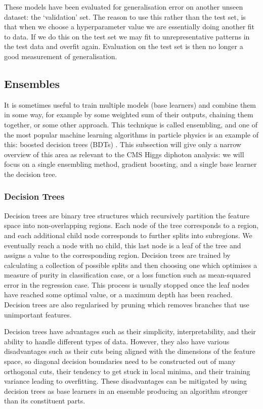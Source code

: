 These models have been evaluated for generalisation error on another unseen dataset: the `validation' set. The reason to use this rather than the test set, is that when we choose a hyperparameter value we are essentially doing another fit to data. If we do this on the test set we may fit to unrepresentative patterns in the test data and overfit again. Evaluation on the test set is then no longer a good measurement of generalisation. 








\subsection{Ensembles}

It is sometimes useful to train multiple models (base learners) and combine them in some way, for example by some weighted sum of their outputs, chaining them together, or some other approach. This technique is called ensembling, and one of the most popular machine learning algorithms in particle physics is an example of this: boosted decision trees (BDTs) \cite{MiniBooneBDT}. This subsection will give only a narrow overview of this area as relevant to the CMS Higgs diphoton analysis: we will focus on a single ensembling method, gradient boosting, and a single base learner the decision tree.


\subsubsection{Decision Trees}
Decision trees \cite{DecisionTrees} are binary tree structures which recursively partition the feature space into non-overlapping regions. Each node of the tree corresponds to a region, and each additional child node corresponds to further splits into subregions. We eventually reach a node with no child, this last node is a leaf of the tree and assigns a value to the corresponding region.  
Decision trees are trained by calculating a collection of possible splits and then choosing one which optimises a measure of purity in classification case, or a loss function such as mean-squared error in the regression case. This process is usually stopped once the leaf nodes have reached some optimal value, or a maximum depth has been reached. 
Decision trees are also regularised by pruning which removes branches that use unimportant features. 

Decision trees have advantages such as their simplicity, interpretability, and their ability to handle different types of data. However, they also have various disadvantages such as their cuts being aligned with the dimensions of the feature space, so diagonal decision boundaries need to be constructed out of many orthogonal cuts, their tendency to get stuck in local minima, and their training variance leading to overfitting. These disadvantages can be mitigated by using decision trees as base learners in an ensemble producing an algorithm stronger than its constituent parts. 

